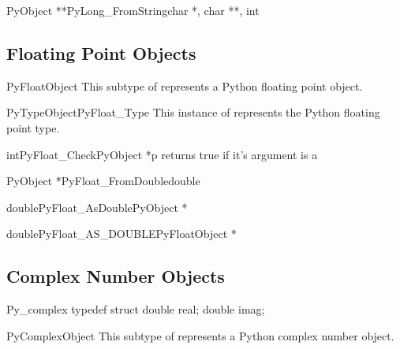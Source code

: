 \begin{cfuncdesc}{PyObject *}{*PyLong_FromString}{char *, char **, int}

\end{cfuncdesc}


\subsection{Floating Point Objects}

\begin{ctypedesc}{PyFloatObject}
This subtype of  represents a Python floating point object.
\end{ctypedesc}

\begin{cvardesc}{PyTypeObject}{PyFloat_Type}
This instance of  represents the Python floating 
point type.
\end{cvardesc}

\begin{cfuncdesc}{int}{PyFloat_Check}{PyObject *p}
returns true if it's argument is a 
\end{cfuncdesc}

\begin{cfuncdesc}{PyObject *}{PyFloat_FromDouble}{double}

\end{cfuncdesc}

\begin{cfuncdesc}{double}{PyFloat_AsDouble}{PyObject *}

\end{cfuncdesc}

\begin{cfuncdesc}{double}{PyFloat_AS_DOUBLE}{PyFloatObject *}

\end{cfuncdesc}


\subsection{Complex Number Objects}

\begin{ctypedesc}{Py_complex}
typedef struct {
   double real;
   double imag;
} 
\end{ctypedesc}

\begin{ctypedesc}{PyComplexObject}
This subtype of  represents a Python complex number object.
\end{ctypedesc}

